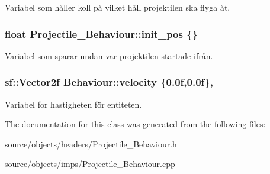 Variabel som håller koll på vilket håll projektilen ska flyga åt. 

\hypertarget{classProjectile__Behaviour_abf935a525d34c12810063c48a54d495e}{
\subsubsection[{init\+\_\+pos}]{\setlength{\rightskip}{0pt plus 5cm}float Projectile\+\_\+\+Behaviour\+::init\+\_\+pos \{\}\hspace{0.3cm}{\ttfamily [private]}}}\label{classProjectile__Behaviour_abf935a525d34c12810063c48a54d495e}


Variabel som sparar undan var projektilen startade ifrån. 

\hypertarget{classBehaviour_a1d52096cf20a59890f7705acbaccf88a}{
\subsubsection[{velocity}]{\setlength{\rightskip}{0pt plus 5cm}sf\+::\+Vector2f Behaviour\+::velocity \{0.\+0f,0.\+0f\}\hspace{0.3cm}{\ttfamily [protected]}, {\ttfamily [inherited]}}}\label{classBehaviour_a1d52096cf20a59890f7705acbaccf88a}


Variabel for hastigheten för entiteten. 



The documentation for this class was generated from the following files\+:\begin{DoxyCompactItemize}
\item 
source/objects/headers/Projectile\+\_\+\+Behaviour.\+h\item 
source/objects/imps/Projectile\+\_\+\+Behaviour.\+cpp\end{DoxyCompactItemize}
